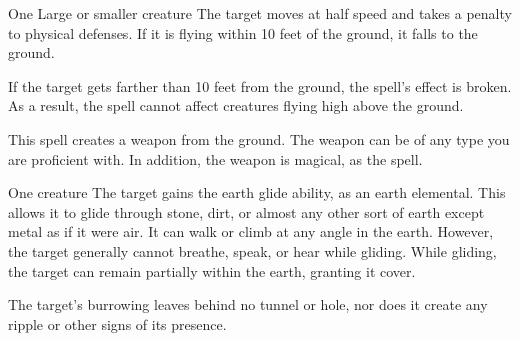 \spellrng{\rngmed}
\spelldur{\durshort}
\begin{spelltarget}{One Large or smaller creature}
    \spelleffect The target moves at half speed and takes a  penalty to physical defenses. If it is flying within 10 feet of the ground, it falls to the ground.
\end{spelltarget}
\spellnotes If the target gets farther than 10 feet from the ground, the spell's effect is broken. As a result, the spell cannot affect creatures flying high above the ground.

\spelldur{\durlong \dismissable}
\spellline
\spelleffect This spell creates a weapon from the ground. The weapon can be of any type you are proficient with. In addition, the weapon is magical, as the  spell.

\spelldur{\durshort}
\begin{spelltarget}{One creature}
    \spelleffect The target gains the earth glide ability, as an earth elemental. This allows it to glide through stone, dirt, or almost any other sort of earth except metal  as if it were air. It can walk or climb at any angle in the earth. However, the target generally cannot breathe, speak, or hear while gliding. While gliding, the target can remain partially within the earth, granting it cover.
\end{spelltarget}
\spellnotes The target's burrowing leaves behind no tunnel or hole, nor does it create any ripple or other signs of its presence.

